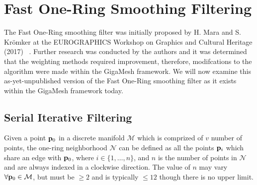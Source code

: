 \chapter{Fast One-Ring Smoothing Filtering}
The Fast One-Ring smoothing filter was initially proposed by H. Mara and S. Krömker at the EUROGRAPHICS Workshop on Graphics and Cultural Heritage (2017) ~\cite[s.~3.2]{Mara17}. Further research was conducted by the authors and it was determined that the weighting methods required improvement, therefore, modifcations to the algorithm were made within the GigaMesh framework. We will now examine this as-yet-unpublished version of the Fast One-Ring smoothing filter as it exists within the GigaMesh framework today.
%
\section{Serial Iterative Filtering}
Given a point $\mathbf{p}_0$ in a discrete manifold $\mathcal{M}$ which is comprized of $v$ number of points, the one-ring neighborhood $\mathcal{N}$ can be defined as all the points $\mathbf{p}_i$ which share an edge with $\mathbf{p}_0$, where $i \in \{1, \ldots, n\}$, and $n$ is the number of points in $\mathcal{N}$ and are always indexed in a clockwise direction. The value of $n$ may vary $\forall \mathbf{p}_0 \in \mathcal{M}$, but must be $\geq 2$ and is typically $\leq 12$ though there is no upper limit.%
%
%
%
%
%
%
%

